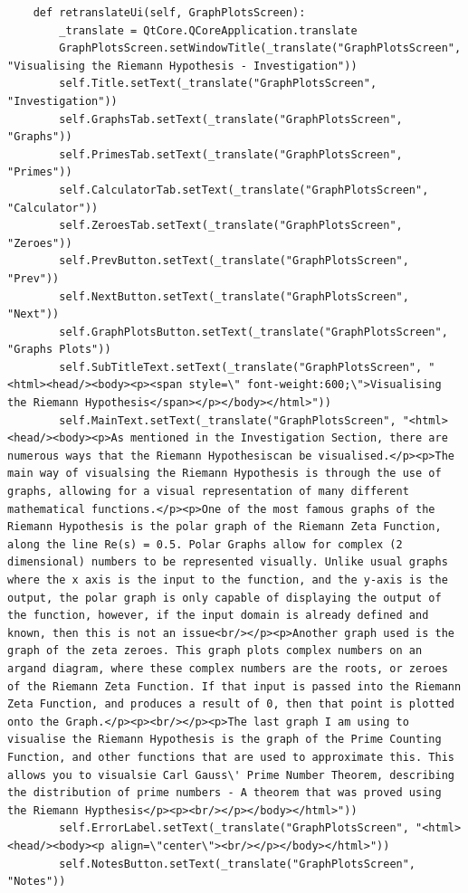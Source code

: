 \documentclass[12pt]{article}
\begin{document}
\begin{lstlisting}
    def retranslateUi(self, GraphPlotsScreen):
        _translate = QtCore.QCoreApplication.translate
        GraphPlotsScreen.setWindowTitle(_translate("GraphPlotsScreen", "Visualising the Riemann Hypothesis - Investigation"))
        self.Title.setText(_translate("GraphPlotsScreen", "Investigation"))
        self.GraphsTab.setText(_translate("GraphPlotsScreen", "Graphs"))
        self.PrimesTab.setText(_translate("GraphPlotsScreen", "Primes"))
        self.CalculatorTab.setText(_translate("GraphPlotsScreen", "Calculator"))
        self.ZeroesTab.setText(_translate("GraphPlotsScreen", "Zeroes"))
        self.PrevButton.setText(_translate("GraphPlotsScreen", "Prev"))
        self.NextButton.setText(_translate("GraphPlotsScreen", "Next"))
        self.GraphPlotsButton.setText(_translate("GraphPlotsScreen", "Graphs Plots"))
        self.SubTitleText.setText(_translate("GraphPlotsScreen", "<html><head/><body><p><span style=\" font-weight:600;\">Visualising the Riemann Hypothesis</span></p></body></html>"))
        self.MainText.setText(_translate("GraphPlotsScreen", "<html><head/><body><p>As mentioned in the Investigation Section, there are numerous ways that the Riemann Hypothesiscan be visualised.</p><p>The main way of visualsing the Riemann Hypothesis is through the use of graphs, allowing for a visual representation of many different mathematical functions.</p><p>One of the most famous graphs of the Riemann Hypothesis is the polar graph of the Riemann Zeta Function, along the line Re(s) = 0.5. Polar Graphs allow for complex (2 dimensional) numbers to be represented visually. Unlike usual graphs where the x axis is the input to the function, and the y-axis is the output, the polar graph is only capable of displaying the output of the function, however, if the input domain is already defined and known, then this is not an issue<br/></p><p>Another graph used is the graph of the zeta zeroes. This graph plots complex numbers on an argand diagram, where these complex numbers are the roots, or zeroes of the Riemann Zeta Function. If that input is passed into the Riemann Zeta Function, and produces a result of 0, then that point is plotted onto the Graph.</p><p><br/></p><p>The last graph I am using to visualise the Riemann Hypothesis is the graph of the Prime Counting Function, and other functions that are used to approximate this. This allows you to visualsie Carl Gauss\' Prime Number Theorem, describing the distribution of prime numbers - A theorem that was proved using the Riemann Hypthesis</p><p><br/></p></body></html>"))
        self.ErrorLabel.setText(_translate("GraphPlotsScreen", "<html><head/><body><p align=\"center\"><br/></p></body></html>"))
        self.NotesButton.setText(_translate("GraphPlotsScreen", "Notes"))
\end{lstlisting}
\end{document}
